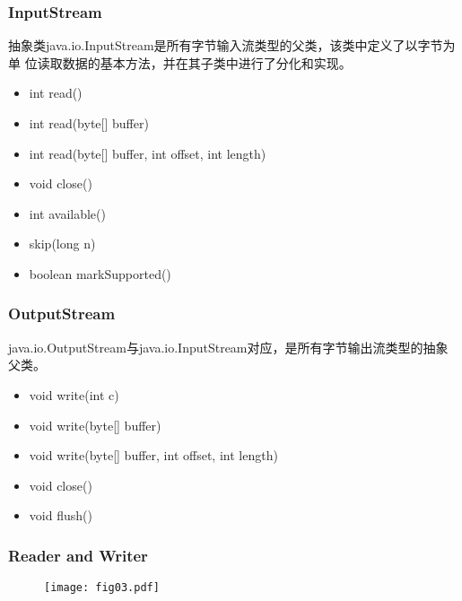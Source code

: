 \begin{frame}[fragile] %
\frametitle{InputStream}

抽象类java.io.InputStream是所有字节输入流类型的父类，该类中定义了以字节为单
位读取数据的基本方法，并在其子类中进行了分化和实现。

\begin{itemize}
\item int read()
\item int read(byte[] buffer)
\item int read(byte[] buffer, int offset, int length)
\end{itemize}
\begin{itemize}
\item void close()
\item int available()
\item skip(long n)
\item boolean markSupported()
\end{itemize}
\end{frame}

\begin{frame}[fragile] %
\frametitle{OutputStream}

java.io.OutputStream与java.io.InputStream对应，是所有字节输出流类型的抽象父类。

\begin{itemize}
\item void write(int c)
\item void write(byte[] buffer)
\item void write(byte[] buffer, int offset, int length)
\end{itemize}
\begin{itemize}
\item void close()
\item void flush()
\end{itemize}
\end{frame}

\begin{frame}[fragile] %
\frametitle{Reader and Writer}

\begin{figure}
\centering
\texttt{[image: fig03.pdf]}
\end{figure}
\end{frame}

